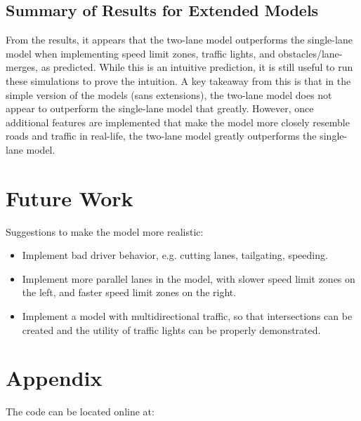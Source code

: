 \documentclass[11pt]{article}
\providecommand{\tightlist}{%
      \setlength{\itemsep}{0pt}\setlength{\parskip}{0pt}}
\begin{document}
    \subsection{Summary of Results for Extended Models}

From the results, it appears that the two-lane model outperforms the
single-lane model when implementing speed limit zones, traffic lights,
and obstacles/lane-merges, as predicted. While this is an intuitive
prediction, it is still useful to run these simulations to prove the
intuition. A key takeaway from this is that in the simple version of the
models (sans extensions), the two-lane model does not appear to
outperform the single-lane model that greatly. However, once additional
features are implemented that make the model more closely resemble roads
and traffic in real-life, the two-lane model greatly outperforms the
single-lane model.

\section{Future Work}

Suggestions to make the model more realistic:

\begin{itemize}
\tightlist
\item
  Implement bad driver behavior, e.g. cutting lanes, tailgating,
  speeding.
\item
  Implement more parallel lanes in the model, with slower speed limit
  zones on the left, and faster speed limit zones on the right.
\item
  Implement a model with multidirectional traffic, so that intersections
  can be created and the utility of traffic lights can be properly
  demonstrated.
\end{itemize}

\section{Appendix}

The code can be located online at: 


    
    
    
    
\end{document}
